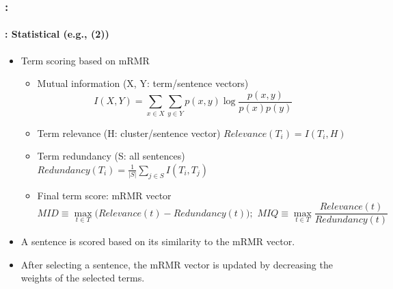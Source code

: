 \documentclass[xcolor=table]{beamer}
\begin{document}
\begin{frame}
	\frametitle{\insertshortsubtitle: \insertsection}
	\framesubtitle{\insertsubsection: Statistical (e.g., \cite{15-oufaida-al} (2))}
	
	\begin{itemize}
		\item Term scoring based on mRMR
		\begin{itemize}
			\item Mutual information (X, Y: term/sentence vectors) 
			\[
			I(X, Y) = \sum_{x \in X} \sum_{y \in Y} p(x, y) \log \frac{p(x, y)}{p(x) p(y)}
			\]
			
			\item Term relevance (H: cluster/sentence vector) $Relevance(T_i) = I(T_i, H)$
			
			\item Term redundancy (S: all sentences) $Redundancy(T_i) = \frac{1}{|S|} \sum_{j \in S} I(T_i, T_j)$
			
			\item Final term score: mRMR vector
			\[
			MID \equiv \max_{t \in T} \big(Relevance(t) - Redundancy(t)\big); \,\, MIQ \equiv \max_{t \in T} \frac{Relevance(t)}{Redundancy(t)}
			\]
		\end{itemize}
		
		\item A sentence is scored based on its similarity to the mRMR vector.  
		\item After selecting a sentence, the mRMR vector is updated by decreasing the weights of the selected terms.
	\end{itemize}
	
\end{frame}
\end{document}
